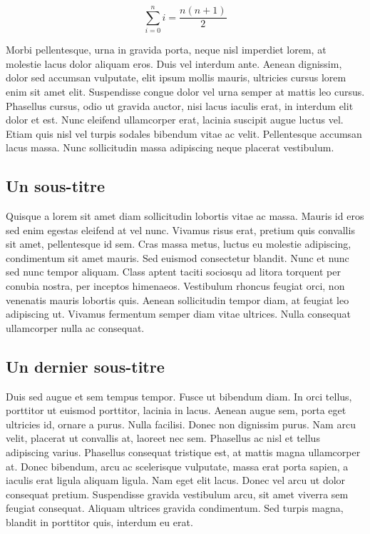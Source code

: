 \[
  \sum_{i=0}^n i = \frac{n(n+1)}{2}
\]

Morbi pellentesque, urna in gravida porta, neque nisl imperdiet lorem, at
molestie lacus dolor aliquam eros. Duis vel interdum ante. Aenean dignissim,
dolor sed accumsan vulputate, elit ipsum mollis mauris, ultricies cursus
lorem enim sit amet elit. Suspendisse congue dolor vel urna semper at mattis
leo cursus. Phasellus cursus, odio ut gravida auctor, nisi lacus iaculis
erat, in interdum elit dolor et est. Nunc eleifend ullamcorper erat, lacinia
suscipit augue luctus vel. Etiam quis nisl vel turpis sodales bibendum vitae
ac velit. Pellentesque accumsan lacus massa. Nunc sollicitudin massa
adipiscing neque placerat vestibulum.

\subsection{Un sous-titre}

Quisque a lorem sit amet diam sollicitudin lobortis vitae ac massa. Mauris
id eros sed enim egestas eleifend at vel nunc. Vivamus risus erat, pretium
quis convallis sit amet, pellentesque id sem. Cras massa metus, luctus eu
molestie adipiscing, condimentum sit amet mauris. Sed euismod consectetur
blandit. Nunc et nunc sed nunc tempor aliquam. Class aptent taciti sociosqu
ad litora torquent per conubia nostra, per inceptos himenaeos. Vestibulum
rhoncus feugiat orci, non venenatis mauris lobortis quis. Aenean
sollicitudin tempor diam, at feugiat leo adipiscing ut. Vivamus fermentum
semper diam vitae ultrices. Nulla consequat ullamcorper nulla ac consequat.

\subsection{Un dernier sous-titre}

Duis sed augue et sem tempus tempor. Fusce ut bibendum diam. In orci tellus,
porttitor ut euismod porttitor, lacinia in lacus. Aenean augue sem, porta
eget ultricies id, ornare a purus. Nulla facilisi. Donec non dignissim
purus. Nam arcu velit, placerat ut convallis at, laoreet nec sem. Phasellus
ac nisl et tellus adipiscing varius. Phasellus consequat tristique est, at
mattis magna ullamcorper at. Donec bibendum, arcu ac scelerisque vulputate,
massa erat porta sapien, a iaculis erat ligula aliquam ligula. Nam eget elit
lacus. Donec vel arcu ut dolor consequat pretium. Suspendisse gravida
vestibulum arcu, sit amet viverra sem feugiat consequat. Aliquam ultrices
gravida condimentum. Sed turpis magna, blandit in porttitor quis, interdum
eu erat.


